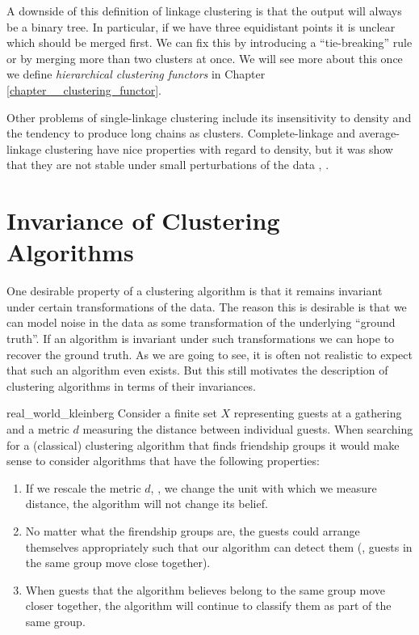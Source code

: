 A downside of this definition of linkage clustering is that the output will always be a binary tree. In particular, if we have three equidistant points it is unclear which should be merged first. We can fix this by introducing a ``tie-breaking'' rule or by merging more than two clusters at once. We will see more about this once we define \emph{hierarchical clustering functors} in Chapter \ref{chapter__clustering_functor}.

Other problems of single-linkage clustering include its insensitivity to density and the tendency to produce long chains as clusters.
Complete-linkage and average-linkage clustering have nice properties with regard to density, but it was show that they are not stable under small perturbations of the data \cite[Sec.~3.6]{JMLR:v11:carlsson10a}, \cite{Lance1967-ci}.

\section{Invariance of Clustering Algorithms}
\label{seciton__preserving_structure}

One desirable property of a clustering algorithm is that it remains invariant under certain transformations of the data.
The reason this is desirable is that we can model noise in the data as some transformation of the underlying ``ground truth''.
If an algorithm is invariant under such transformations we can hope to recover the ground truth. As we are going to see, it is often not realistic to expect that such an algorithm even exists. But this still motivates the description of clustering algorithms in terms of their invariances.

\begin{example}{}{real_world_kleinberg}
Consider a finite set $X$ representing guests at a gathering and a metric $d$ measuring the distance between individual guests.
When searching for a (classical) clustering algorithm that finds friendship groups it would make sense to consider algorithms that have the following properties:

\begin{enumerate}
    \item If we rescale the metric $d$, \ie, we change the unit with which we measure distance, the algorithm will not change its belief.
    \item No matter what the firendship groups are, the guests could arrange themselves appropriately such that our algorithm can detect them (\ie, guests in the same group move close together).
    \item When guests that the algorithm believes belong to the same group move closer together, the algorithm will continue to classify them as part of the same group.
\end{enumerate}
\end{example}

